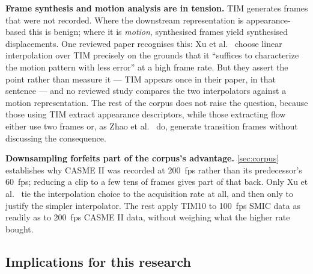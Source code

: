 \textbf{Frame synthesis and motion analysis are in tension.} TIM generates frames that were not recorded. Where the downstream representation is appearance-based this is benign; where it is \textit{motion}, synthesised frames yield synthesised displacements. One reviewed paper recognises this: Xu et al.~\cite{xu2017} choose linear interpolation over TIM precisely on the grounds that it ``suffices to characterize the motion pattern with less error'' at a high frame rate. But they assert the point rather than measure it --- TIM appears once in their paper, in that sentence --- and no reviewed study compares the two interpolators against a motion representation. The rest of the corpus does not raise the question, because those using TIM extract appearance descriptors, while those extracting flow either use two frames or, as Zhao et al.~\cite{zhaoS2021} do, generate transition frames without discussing the consequence.

\textbf{Downsampling forfeits part of the corpus's advantage.} \autoref{sec:corpus} establishes why CASME II was recorded at 200~fps rather than its predecessor's 60~fps; reducing a clip to a few tens of frames gives part of that back. Only Xu et al.~\cite{xu2017} tie the interpolation choice to the acquisition rate at all, and then only to justify the simpler interpolator. The rest apply TIM10 to 100~fps SMIC data as readily as to 200~fps CASME II data, without weighing what the higher rate bought.

\subsection{Implications for this research}
\label{sec:tim-implications}

